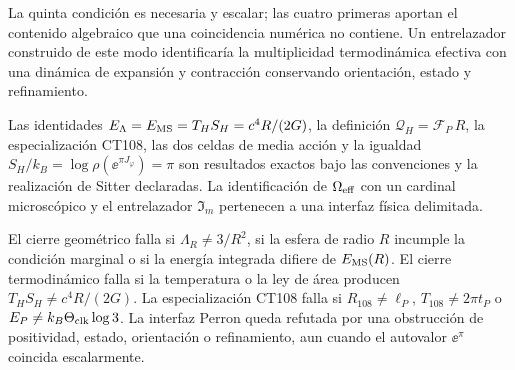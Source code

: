 La quinta condici\'on es necesaria y escalar; las cuatro primeras aportan el
contenido algebraico que una coincidencia num\'erica no contiene. Un
entrelazador construido de este modo identificar\'ia la multiplicidad
termodin\'amica efectiva con una din\'amica de expansi\'on y contracci\'on
conservando orientaci\'on, estado y refinamiento.

\begin{proofstatusbox}
Las identidades
\(E_\Lambda=E_{\rm MS}=T_HS_H=c^4R/(2G)\), la definici\'on
\(\mathcal Q_H=\mathscr F_P\,R\), la especializaci\'on CT108, las dos celdas
de media acci\'on y la igualdad
\(S_H/k_B=\log\rho(\ee^{\pi J_\varphi})=\pi\) son resultados exactos bajo
las convenciones y la realizaci\'on de Sitter declaradas. La identificaci\'on
de \(\Omega_{\rm eff}\) con un cardinal microsc\'opico y el entrelazador
\(\mathfrak I_m\) pertenecen a una interfaz f\'isica delimitada.
\end{proofstatusbox}


\begin{falsifierbox}
El cierre geom\'etrico falla si \(\Lambda_R\ne3/R^2\), si la esfera de
radio \(R\) incumple la condici\'on marginal o si la energ\'ia integrada difiere de
\(E_{\rm MS}(R)\). El cierre termodin\'amico falla si la temperatura o la
ley de \'area producen \(T_HS_H\ne c^4R/(2G)\). La especializaci\'on CT108
falla si \(R_{108}\ne\ell_P\), \(T_{108}\ne2\pi t_P\) o
\(E_P\ne k_B\Theta_{\rm clk}\log3\). La interfaz Perron queda refutada por
una obstrucci\'on de positividad, estado, orientaci\'on o refinamiento, aun
cuando el autovalor \(\ee^\pi\) coincida escalarmente.
\end{falsifierbox}
